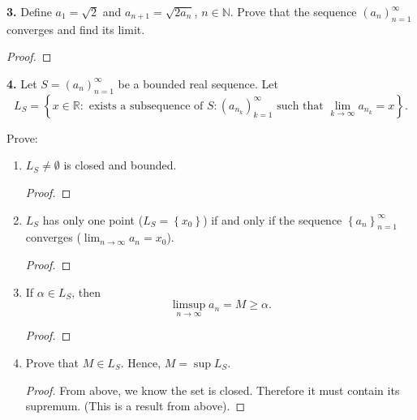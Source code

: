 \documentclass{article}
\newcommand{\R}{\mathbb{R}}
\newcommand{\N}{\mathbb{N}}
\newcommand{\set}[1]{\left\{ #1 \right\}}
\begin{document}
\newpage %

\textbf{3. }
Define $a_1 = \sqrt{2}$ and $a_{n + 1} = \sqrt{2 a_n}$, $n \in \N$. Prove that the sequence $(a_n)_{n = 1}^\infty$ converges and find its limit.

\begin{proof}
    
\end{proof}


\newpage %


\textbf{4. }
Let $S = (a_n)_{n = 1}^\infty$ be a bounded real sequence. Let
$$L_S = \set{x \in \R : \text{ exists a subsequence of } S : (a_{n_k})_{k = 1}^\infty \text{ such that } \lim_{k \to \infty} a_{n_k} = x}.$$

Prove:
\begin{enumerate}
    \item 
    $L_S \ne \emptyset$ is closed and bounded.
    \begin{proof}
        
    \end{proof}


    \item 
    $L_S$ has only one point ($L_S = \set{x_0}$) if and only if the sequence $\set{a_n}_{n = 1}^\infty$ converges ($\lim_{n \to \infty} a_n = x_0$).
    \begin{proof}



    \end{proof}


    \item 
    If $\alpha \in L_S$, then
    $$\limsup_{n \to \infty} a_n = M \ge \alpha.$$
    \begin{proof}
        
    \end{proof}


    \item 
    Prove that $M \in L_S$. Hence, $M = \sup L_S$.
    \begin{proof}
        From above, we know the set is closed. Therefore it must contain its supremum. (This is a result from above). 
    \end{proof}

\end{enumerate}
\end{document}
